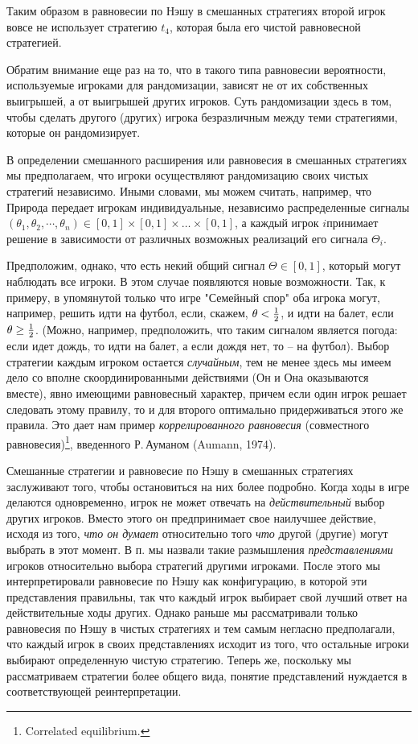 {Таким образом в равновесии по Нэшу в смешанных стратегиях второй
игрок вовсе не использует стратегию $t_4$, которая была его чистой
равновесной стратегией.

Обратим внимание еще раз на то, что в такого типа равновесии
вероятности, используемые игроками для рандомизации, зависят не от
их собственных выигрышей, а от выигрышей других игроков. Суть
рандомизации здесь в том, чтобы сделать другого (других) игрока
безразличным между теми стратегиями, которые он рандомизирует.


В определении смешанного расширения или равновесия в смешанных
стратегиях мы предполагаем, что игроки осуществляют рандомизацию
своих чистых стратегий независимо. Иными словами, мы можем считать,
например, что Природа передает игрокам индивидуальные, независимо
распределенные сигналы $(\theta_1,\theta_2,\cdots,\theta_n)
\in[0,1]\times [0,1]\times\ldots\times [0,1]$, а каждый игрок
$i$принимает решение в зависимости от различных возможных реализаций
его сигнала $\Theta_i$.

Предположим, однако, что есть некий общий сигнал $\Theta\in [0,1]$,
который могут наблюдать все игроки. В этом случае появляются новые
возможности. Так, к примеру, в упомянутой только что игре "Семейный
спор" оба игрока могут, например, решить идти на футбол, если,
скажем, $\theta<{{1}\over{2}}$, и идти на балет, если $\theta\ge
{{1}\over{2}}$. (Можно, например, предположить, что таким
сигналом является погода: если идет дождь, то идти на балет,
а если дождя нет, то -- на футбол). Выбор стратегии каждым игроком остается {\it
случайным}, тем не менее здесь мы имеем дело со вполне
скоординированными действиями (Он и Она оказываются вместе), явно
имеющими равновесный характер, причем если один игрок решает
следовать этому правилу, то и для второго оптимально придерживаться
этого же правила. Это дает нам пример {\it коррелированного
равновесия} (совместного равновесия)\footnote{ Correlated
equilibrium.}, введенного Р.\,Ауманом (Aumann, 1974).


Смешанные стратегии и равновесие по Нэшу в смешанных стратегиях
заслуживают того, чтобы остановиться на них более подробно. Когда
ходы в игре делаются одновременно, игрок не может отвечать на
\emph{действительный} выбор других игроков. Вместо этого он
предпринимает свое наилучшее действие, исходя из того, \emph{что он
думает} относительно того \emph{что} другой (другие) могут выбрать в
этот момент. В п.   мы назвали такие размышления
\emph{представлениями} игроков относительно выбора стратегий другими
игроками. После этого мы интерпретировали равновесие по Нэшу как
конфигурацию, в которой эти представления правильны, так что каждый
игрок выбирает свой лучший ответ на действительные ходы других.
Однако раньше мы рассматривали только равновесия по Нэшу в чистых
стратегиях и тем самым негласно предполагали, что каждый игрок в
своих представлениях исходит из того, что остальные игроки выбирают
определенную чистую стратегию. Теперь же, поскольку мы рассматриваем
стратегии более общего вида, понятие представлений нуждается в
соответствующей реинтерпретации.

}
